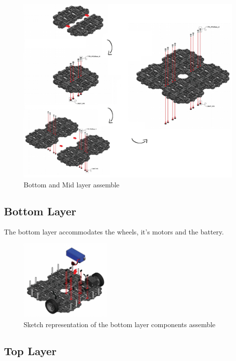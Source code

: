 \documentclass{article}
\begin{document}
 \begin{figure}[h]
 \centering
 \includegraphics[width=1\textwidth]{step1.png}
 \caption{Bottom and Mid layer assemble}
 \end{figure}
 
 \subsection{Bottom Layer}
 
 The bottom layer accommodates the wheels, it's motors and the battery. 
 
  \begin{figure}[h]
 \centering
 \includegraphics[width=0.4\textwidth]{layer1.png}
 \caption{Sketch representation of the bottom layer components assemble}
 \end{figure}
 
 \subsection{Top Layer}
 
\end{document}
